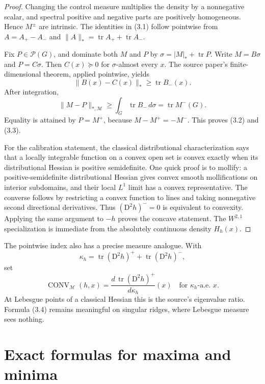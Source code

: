 \documentclass[11pt]{article}
\newcommand{\tr}{\operatorname{tr}}
\newcommand{\Pos}{\mathcal P}
\newcommand{\M}{\mathcal M}
\newcommand{\Hess}{\mathrm D^2}
\newcommand{\Conv}{\operatorname{CONV}}
\begin{document}
\begin{proof}
Changing the control measure multiplies the density by a nonnegative scalar,
and spectral positive and negative parts are positively homogeneous.  Hence
\(M^\pm\) are intrinsic.  The identities in (3.1) follow pointwise from
\(A=A_+-A_-\) and
\(\|A\|_*=\tr A_++\tr A_-\).

Fix \(P\in\Pos(G)\), and dominate both \(M\) and \(P\) by
\(\sigma=|M|_*+\tr P\).  Write \(M=B\sigma\) and \(P=C\sigma\).  Then
\(C(x)\succeq0\) for \(\sigma\)-almost every \(x\).  The source paper's
finite-dimensional theorem, applied pointwise, yields
\[
 \|B(x)-C(x)\|_*\ge \tr B_-(x).
\]
After integration,
\[
 \|M-P\|_{*,\M}\ge\int_G\tr B_-\,d\sigma
 =\tr M^-(G).
\]
Equality is attained by \(P=M^+\), because \(M-M^+=-M^-\).  This proves
(3.2) and (3.3).

For the calibration statement, the classical distributional characterization
says that a locally integrable function on a convex open set is convex exactly
when its distributional Hessian is positive semidefinite.  One quick proof is
to mollify: a positive-semidefinite distributional Hessian gives convex smooth
mollifications on interior subdomains, and their local \(L^1\) limit has a
convex representative.  The converse follows by restricting a convex
function to lines and taking nonnegative second directional derivatives.
Thus \((\Hess h)^-=0\) is equivalent to convexity.  Applying the same argument
to \(-h\) proves the concave statement.  The \(W^{2,1}\) specialization is
immediate from the absolutely continuous density \(H_h(x)\).
\end{proof}

The pointwise index also has a precise measure analogue.  With
\[
 \kappa_h=\tr(\Hess h)^++\tr(\Hess h)^-,
\]
set
\[
 \Conv_{\M}(h,x)=
 \frac{d\,\tr(\Hess h)^+}{d\kappa_h}(x)
 \quad\text{for }\kappa_h\text{-a.e. }x.             \tag{3.4}
\]
At Lebesgue points of a classical Hessian this is the source's eigenvalue
ratio.  Formula (3.4) remains meaningful on singular ridges, where Lebesgue
measure sees nothing.

\section{Exact formulas for maxima and minima}
\end{document}
